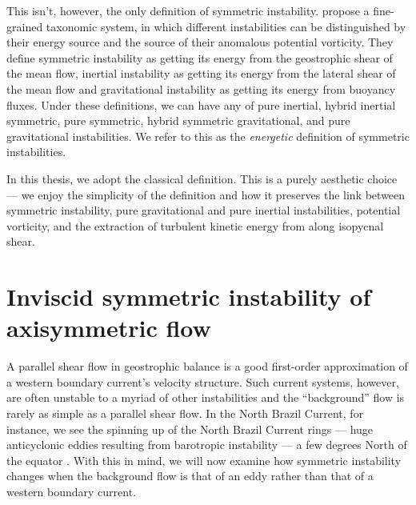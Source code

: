     This isn't, however, the only definition of symmetric instability. \citet{Thomas2013} propose a fine-grained taxonomic system, in which different instabilities can be distinguished by their energy source and the source of their anomalous potential vorticity. They define symmetric instability as getting its energy from the geostrophic shear of the mean flow, inertial instability as getting its energy from the lateral shear of the mean flow and gravitational instability as getting its energy from buoyancy fluxes. Under these definitions, we can have any of pure inertial, hybrid inertial symmetric, pure symmetric, hybrid symmetric gravitational, and pure gravitational instabilities. We refer to this as the \textit{energetic} definition of symmetric instabilities.

    In this thesis, we adopt the classical definition. This is a purely aesthetic choice --- we enjoy the simplicity of the definition and how it preserves the link between symmetric instability, pure gravitational and pure inertial instabilities, potential vorticity, and the extraction of turbulent kinetic energy from along isopycnal shear.

\section{Inviscid symmetric instability of axisymmetric flow}
\label{sec:InviscidCentrifugal}
A parallel shear flow in geostrophic balance is a good first-order approximation of a western boundary current's velocity structure. Such current systems, however, are often unstable to a myriad of other instabilities and the ``background'' flow is rarely as simple as a parallel shear flow. In the North Brazil Current, for instance, we see the spinning up of the North Brazil Current rings --- huge anticyclonic eddies resulting from barotropic instability --- a few degrees North of the equator \citep{Edwards1998II, Castelao2011}. With this in mind, we will now examine how symmetric instability changes when the background flow is that of an eddy rather than that of a western boundary current.

